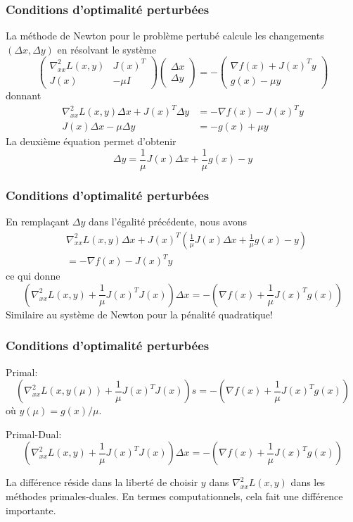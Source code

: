\documentclass[t,usepdftitle=false]{beamer}
\def\blue{\color{blue}}
\begin{document}
\begin{frame}
\frametitle{Conditions d'optimalité perturbées}

La méthode de Newton pour le problème pertubé calcule les changements $(\Delta x, \Delta y)$ en résolvant le système
$$
\begin{pmatrix}
\nabla^2_{xx} L(x, y) & J(x)^T \\
J(x) & -\mu I
\end{pmatrix}
\begin{pmatrix}
\Delta x \\ \Delta y
\end{pmatrix}
=
- \begin{pmatrix}
\nabla f(x) + J(x)^Ty \\ g(x) - \mu y
\end{pmatrix}
$$
donnant
\begin{align*}
\nabla^2_{xx} L(x, y)\Delta x + J(x)^T\Delta y &=  -\nabla f(x) - J(x)^Ty \\
J(x)\Delta x -\mu \Delta y &= -g(x) + \mu y
\end{align*}
La deuxième équation permet d'obtenir
$$
\Delta y = \frac{1}{\mu}J(x)\Delta x + \frac{1}{\mu}g(x) - y
$$

\end{frame}

\begin{frame}
\frametitle{Conditions d'optimalité perturbées}

En remplaçant $\Delta y$ dans l'égalité précédente, nous avons
\begin{align*}
&\nabla^2_{xx} L(x, y)\Delta x + J(x)^T\left( \frac{1}{\mu}J(x)\Delta x + \frac{1}{\mu}g(x) - y \right) \\ &=  -\nabla f(x) - J(x)^Ty
\end{align*}
ce qui donne
$$
\left( \nabla^2_{xx} L(x, y) + \frac{1}{\mu} J(x)^TJ(x) \right) \Delta x = - \left( \nabla f(x) + \frac{1}{\mu} J(x)^T g(x) \right)
$$
Similaire au système de Newton pour la pénalité quadratique!

\end{frame}

\begin{frame}
\frametitle{Conditions d'optimalité perturbées}

{\blue Primal:}
$$
\left( \nabla^2_{xx} L(x, y(\mu)) + \frac{1}{\mu} J(x)^TJ(x) \right) s = - \left( \nabla f(x) + \frac{1}{\mu} J(x)^T g(x) \right)
$$
où $y(\mu) = g(x)/\mu$.

\mbox{}

{\blue Primal-Dual:}
$$
\left( \nabla^2_{xx} L(x, y) + \frac{1}{\mu} J(x)^TJ(x) \right) \Delta x = - \left( \nabla f(x) + \frac{1}{\mu} J(x)^T g(x) \right)
$$

\mbox{}

La différence réside dans la liberté de choisir $y$ dans $\nabla^2_{xx} L(x, y)$ dans les méthodes primales-duales.
En termes computationnels, cela fait une différence importante.

\end{frame}
\end{document}

